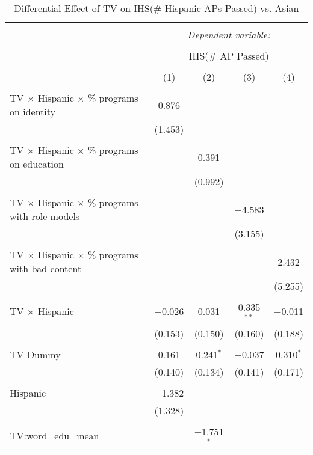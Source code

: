 
\begin{table}[!htbp] \centering 
  \caption{Differential Effect of TV on IHS(\# Hispanic APs Passed) vs. Asian} 
  \label{} 
\begin{tabular}{@{\extracolsep{-2pt}}lcccc} 
\\[-1.8ex]\hline 
\hline \\[-1.8ex] 
 & \multicolumn{4}{c}{\textit{Dependent variable:}} \\ 
\cline{2-5} 
\\[-1.8ex] & \multicolumn{4}{c}{IHS(\# AP Passed)} \\ 
\\[-1.8ex] & (1) & (2) & (3) & (4)\\ 
\hline \\[-1.8ex] 
 TV $\times$ Hispanic $\times$ \% programs on identity & 0.876 &  &  &  \\ 
  & (1.453) &  &  &  \\ 
  & & & & \\ 
 TV $\times$ Hispanic $\times$ \% programs on education &  & 0.391 &  &  \\ 
  &  & (0.992) &  &  \\ 
  & & & & \\ 
 TV $\times$ Hispanic $\times$ \% programs with role models &  &  & $-$4.583 &  \\ 
  &  &  & (3.155) &  \\ 
  & & & & \\ 
 TV $\times$ Hispanic $\times$ \% programs with bad content &  &  &  & 2.432 \\ 
  &  &  &  & (5.255) \\ 
  & & & & \\ 
 TV $\times$ Hispanic & $-$0.026 & 0.031 & 0.335$^{**}$ & $-$0.011 \\ 
  & (0.153) & (0.150) & (0.160) & (0.188) \\ 
  & & & & \\ 
 TV Dummy & 0.161 & 0.241$^{*}$ & $-$0.037 & 0.310$^{*}$ \\ 
  & (0.140) & (0.134) & (0.141) & (0.171) \\ 
  & & & & \\ 
 Hispanic & $-$1.382 &  &  &  \\ 
  & (1.328) &  &  &  \\ 
  & & & & \\ 
 TV:word\_edu\_mean &  & $-$1.751$^{*}$ &  &  \\ 

\end{tabular}
\end{table}
